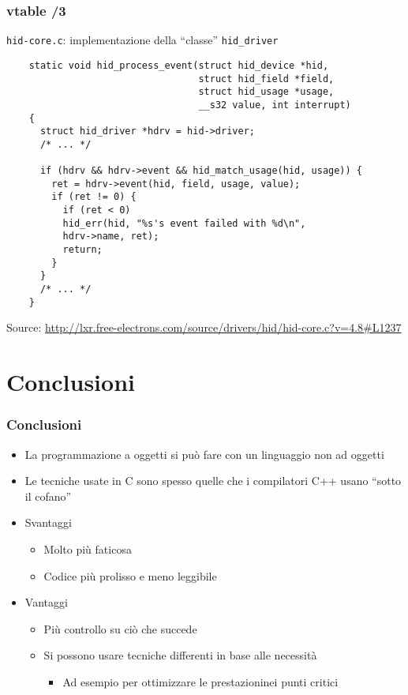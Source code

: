 \documentclass[xetex,table]{beamer}
\begin{document}
\begin{frame}[fragile]
  \frametitle{vtable /3}
  \texttt{hid-core.c}: implementazione della ``classe''
  \texttt{hid\_driver}

  \begin{verbatim}
    static void hid_process_event(struct hid_device *hid,
                                  struct hid_field *field,
                                  struct hid_usage *usage,
                                  __s32 value, int interrupt)
    {
      struct hid_driver *hdrv = hid->driver;
      /* ... */

      if (hdrv && hdrv->event && hid_match_usage(hid, usage)) {
        ret = hdrv->event(hid, field, usage, value);
        if (ret != 0) {
          if (ret < 0)
          hid_err(hid, "%s's event failed with %d\n",
          hdrv->name, ret);
          return;
        }
      }
      /* ... */
    }
  \end{verbatim}
  {\tiny Source:
    \url{http://lxr.free-electrons.com/source/drivers/hid/hid-core.c?v=4.8#L1237}}
\end{frame}

\section{Conclusioni}

\begin{frame}
  \frametitle{Conclusioni}
  \begin{itemize}
  \item La programmazione a oggetti si può fare con un linguaggio non
    ad oggetti
  \item Le tecniche usate in C sono spesso quelle che i compilatori
    C++ usano ``sotto il cofano''
  \item Svantaggi
    \begin{itemize}
    \item Molto più faticosa
    \item Codice più prolisso e meno leggibile
    \end{itemize}
  \item Vantaggi
    \begin{itemize}
    \item Più controllo su ciò che succede
    \item Si possono usare tecniche differenti in base alle necessità
      \begin{itemize}
      \item Ad esempio per ottimizzare le prestazioninei punti critici
      \end{itemize}
    \end{itemize}
  \end{itemize}
\end{frame}
\end{document}
